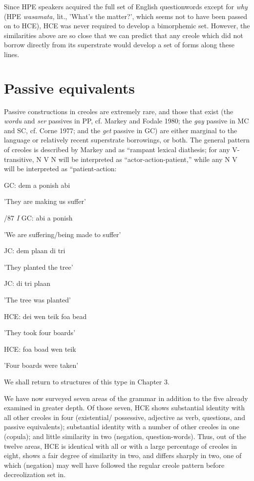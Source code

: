 Since HPE speakers acquired the full set of English question\-words except for \textit{why} (HPE \textit{wasamata,} lit., 'What's the matter?', which seems not to have been passed on to HCE), HCE was never required to develop a bimorphemic set. However, the similarities above are so close that we can predict that any creole which did not borrow directly from its superstrate would develop a set of forms along these lines.

\section{Passive equivalents}

Passive constructions in creoles are extremely rare, and those that exist (the \textit{wordu} and \textit{ser} passives in PP, cf. Markey and Fodale 1980; the \textit{gay} passive in MC and SC, cf. Corne 1977; and the \textit{get} passive in
GC) are either marginal to the language or relatively recent super\-strate borrowings, or both. The general pattern of creoles is described by Markey and \citet{Fodale1980} as ``rampant lexical diathesis{\textquotedbl}; for any V-transitive, N V N will be interpreted as ``actor-action-patient,'' while any N V will be interpreted as ``patient-action{\textquotedbl}:

\ea\label{ex:86}
 GC: dem a ponish abi
\glt
\z

'They are making us suffer'

/87 \textit{I }GC: abi a ponish

'We are suffering/being made to suffer'

\ea\label{ex:88}
 JC: dem plaan di tri
\glt
\z

'They planted the tree'

\ea\label{ex:89}
 JC: di tri plaan
\glt
\z

'The tree was planted'

\ea\label{ex:90}
 HCE: dei wen teik foa bead
\glt
\z

'They took four boards'

\ea\label{ex:91}
 HCE: foa boad wen teik
\glt
\z

'Four boards were taken'

We shall return to structures of this type in Chapter 3.

We have now surveyed seven areas of the grammar in addition to the five already examined in greater depth. Of those seven, HCE shows substantial identity with all other creoles in four (existential/ possessive, adjective as verb, questions, and passive equivalents); substantial iden\-tity with a number of other creoles in one (copula); and little simi\-larity in two (negation, question-words). Thus, out of the twelve areas, HCE is identical with all or with a large percentage of creoles in eight, shows a fair degree of similarity in two, and differs sharply in two, one of which (negation) may well have followed the regular creole pattern before decreolization set in.

